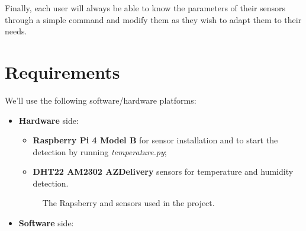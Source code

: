 Finally, each user will always be able to know the parameters of their sensors through a simple command and modify them as they wish to adapt them to their needs.
\newpage

\section{Requirements}\label{sec:requirements}
We'll use the following software/hardware platforms:
\begin{itemize}
    \item \textbf{Hardware} side:
    \begin{itemize}
        \item \textbf{Raspberry Pi 4 Model B} for sensor installation and to start the detection by running \textit{temperature.py};
        \item \textbf{DHT22 AM2302 AZDelivery} sensors for temperature and humidity detection.
    \end{itemize}
    \begin{figure}[H]%
        \centering
        \hspace{10mm}
        \caption{The Rapsberry and sensors used in the project.}
        \label{fig:hardware}%
    \end{figure}
    \item \textbf{Software} side:
    \begin{itemize}

\end{itemize}
\end{itemize}

